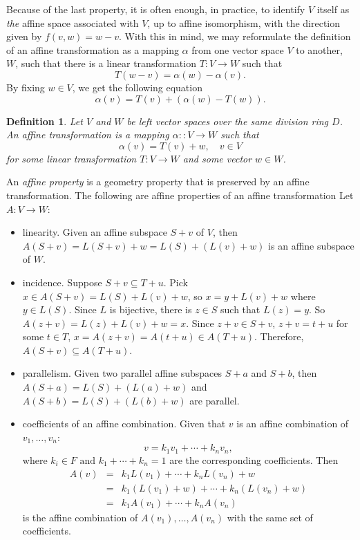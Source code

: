 \documentclass[12pt]{article}
\newtheorem{defn}{Definition}
\begin{document}
Because of the last property, it is often enough, in practice, to identify $V$ itself as \emph{the} affine space associated with $V$, up to affine isomorphism, with the direction given by $f(v,w)=w-v$.  With this in mind, we may reformulate the definition of an affine transformation as a mapping $\alpha$ from one vector space $V$ to another, $W$, such that there is a linear transformation $T:V\to W$ such that $$T(w-v)=\alpha(w)-\alpha(v).$$  By fixing $w\in V$, we get the following equation $$\alpha(v)=T(v)+(\alpha(w)-T(w)).$$

\begin{defn} Let $V$ and $W$ be left vector spaces over the same division ring $D$. An \emph{affine transformation} is a mapping 
$\alpha:\colon V \to W$ such that 
$$\alpha(v)=T(v)+w, \quad v\in V$$
for some linear transformation $T\colon V\to W$ and some vector $w\in W$. 
\end{defn}

An \emph{affine property} is a geometry property that is preserved by an affine transformation.  The following are affine properties of an affine transformation Let $A:V\to W$:

\begin{itemize}
\item linearity.  Given an affine subspace $S+v$ of $V$, then $A(S+v)=L(S+v)+w=L(S)+(L(v)+w)$ is an affine subspace of $W$.
\item incidence.  Suppose $S+v\subseteq T+u$.  Pick $x\in A(S+v)=L(S)+L(v)+w$, so $x=y+L(v)+w$ where $y\in L(S)$.  Since $L$ is bijective, there is $z\in S$ such that $L(z)=y$.  So $A(z+v)=L(z)+L(v)+w=x$.  Since $z+v\in S+v$, $z+v=t+u$ for some $t\in T$, $x=A(z+v)=A(t+u)\in A(T+u)$.  Therefore, $A(S+v)\subseteq A(T+u)$.
\item parallelism.  Given two parallel affine subspaces $S+a$ and $S+b$, then $A(S+a)=L(S)+(L(a)+w)$ and $A(S+b)=L(S)+(L(b)+w)$ are parallel.
\item coefficients of an affine combination.  Given that $v$ is an affine combination of $v_1,\ldots,v_n$: $$v=k_1v_1+\cdots +k_nv_n,$$ where $k_i\in F\mbox{ and }k_1+\cdots+k_n=1$ are the corresponding coefficients.  Then 
\begin{eqnarray*}
A(v) &=& k_1L(v_1)+\cdots+k_nL(v_n)+w \\
&=& k_1(L(v_1)+w)+\cdots+k_n(L(v_n)+w) \\
&=& k_1A(v_1)+\cdots+k_nA(v_n)
\end{eqnarray*} is the affine combination of $A(v_1),\ldots,A(v_n)$ with the same set of coefficients.
\end{itemize}
\end{document}
